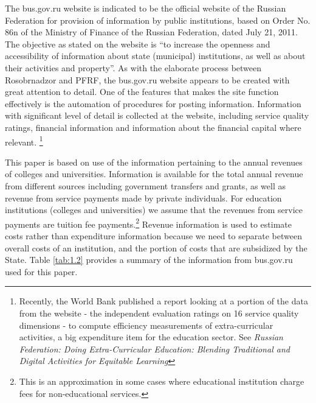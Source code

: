 \documentclass[alpha-refs]{wiley-article-05g}
\begin{document}
\vspace{-0.2in}

The bus.gov.ru website is indicated to be the official website of the Russian Federation for provision of information by public institutions, based on Order No. 86n of the Ministry of Finance of the Russian Federation, dated July 21, 2011. The objective as stated on the website is ``to increase the openness and accessibility of information about state (municipal) institutions, as well as about their activities and property''. As with the elaborate process between Rosobrnadzor and PFRF, the bus.gov.ru website appears to be created with great attention to detail. One of the features that makes the site function effectively is the automation of procedures for posting information. Information with significant level of detail is collected at the website, including service quality ratings, financial information and information about the financial capital where relevant. \footnote{Recently, the World Bank published a report looking at a portion of the data from the website - the independent evaluation ratings on 16 service quality dimensions - to compute efficiency measurements of extra-curricular activities, a big expenditure item for the education sector. See \textit{Russian Federation: Doing Extra-Curricular Education: Blending Traditional and Digital Activities for Equitable Learning}}

\vspace{0.5em}

This paper is based on use of the information pertaining to the annual revenues of colleges and universities. Information is available for the total annual revenue from different sources including government transfers and grants, as well as revenue from service payments made by private individuals. For education institutions (colleges and universities) we assume that the revenues from service payments are tuition fee payments.\footnote{This is an approximation in some cases where educational institution charge fees for non-educational services.} Revenue information is used to estimate costs rather than expenditure information because we need to separate between overall costs of an institution, and the portion of costs that are subsidized by the State. Table \ref{tab:1.2} provides a summary of the information from bus.gov.ru used for this paper. 
\end{document}
